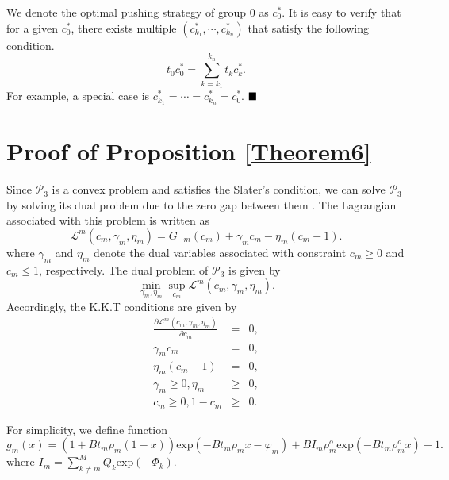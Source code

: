 \documentclass[12pt, draftclsnofoot, onecolumn]{IEEEtran}
\begin{document}
We denote the optimal pushing strategy of group 0 as $c_0^{\ast}$. It is easy to verify that for a given $c_0^{\ast}$, there exists multiple $(c_{k_1}^{\ast},\cdots,c_{k_n}^{\ast})$ that satisfy the following condition.
\begin{equation}
t_0c_0^{\ast} =\sum\limits_{k=k_1}^{k_n} t_k c_k^{\ast}.
\end{equation}
For example, a special case is $c_{k_1}^{\ast}=\cdots=c_{k_n}^{\ast}=c_0^{\ast}$.
$\hfill\blacksquare$

\section{Proof of Proposition \ref{Theorem6}}
\setcounter{equation}{0}
\renewcommand{\theequation}{\thesection.\arabic{equation}}
Since $\mathcal{P}_3$ is a convex problem and satisfies the Slater's condition, we can solve $\mathcal{P}_3$ by solving its dual problem due to the zero gap between them \cite{boyd2004convex}. The Lagrangian associated with this problem is written as
\begin{equation}
\mathcal{L}^{m}(c_m, \gamma_m, \eta_m)=G_{-m}(c_m)  +\gamma_m c_m - \eta_m(c_m -1).
\end{equation}
where $\gamma_m$ and $\eta_m$ denote the dual variables associated with constraint $c_m \geq 0$ and $c_m \leq 1$, respectively.  The dual problem of $\mathcal{P}_3$ is given by
\begin{equation}
\mathop{\min }_{\gamma_m,\eta_m} \mathop{\sup }_{c_m} \mathcal{L}^{m}(c_m, \gamma_m, \eta_m).
\end{equation}
Accordingly, the K.K.T conditions are given by
\begin{eqnarray}
\frac{\partial \mathcal{L}^{m}(c_m, \gamma_m, \eta_m)}{\partial c_m} &=&0 \label {lm},\\
\gamma_m c_m &=&0,   \label{gama} \\
\eta_m (c_m-1) &=&0,     \label{eta}   \\
\gamma_m \geq 0 ,\eta_m &\geq &0, \\
c_m \geq 0,1-c_m &\geq& 0.
\end{eqnarray}

For simplicity, we define function
\begin{equation}
g_m(x) =(1+ B t_m \rho_m(1-x)) \textrm{exp}({-B t_m \rho_m x - \varphi_m}) + B I_m \rho_m^o \textrm{exp}(-{B t_m \rho_m^o x}) -1.
\end{equation}
where $I_m=\sum_{k \neq m}^M Q_k \textrm{exp}(- \Phi_k)$.
\end{document}
